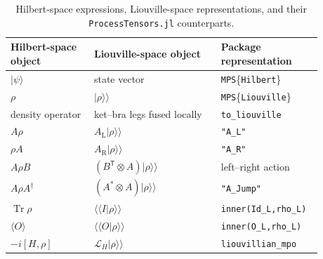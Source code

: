 %
\begin{table}[H]
    \centering \caption{Hilbert-space expressions, Liouville-space representations, and their \texttt{ProcessTensors.jl} counterparts.}
    \label{tab:liouville-dictionary}
    \begin{tabular}{p{0.25\linewidth}p{0.38\linewidth}p{0.25\linewidth}}
        \hline
        Hilbert-space object
        & Liouville-space object
        & Package representation \\ \hline \(\lvert\psi\rangle\)
        & state vector
        & \texttt{MPS}\{\texttt{Hilbert}\} \\ \(\rho\)
        & \(\lvert\rho\rangle\!\rangle\)
        & \texttt{MPS}\{\texttt{Liouville}\} \\ density operator
        & ket--bra legs fused locally
        & \texttt{to\_liouville} \\ \(A\rho\)
        & \(A_{\mathrm L}\lvert\rho\rangle\!\rangle\)
        & \texttt{"A\_L"} \\ \(\rho A\)
        & \(A_{\mathrm R}\lvert\rho\rangle\!\rangle\)
        & \texttt{"A\_R"} \\ \(A\rho B\)
        & \((B^{\mathsf T}\otimes A)\lvert\rho\rangle\!\rangle\)
        & left--right action \\ \(A\rho A^\dagger\)
        & \((A^*\otimes A)\lvert\rho\rangle\!\rangle\)
        & \texttt{"A\_Jump"} \\ \(\operatorname{Tr}\rho\)
        & \(\langle\!\langle I\vert\rho\rangle\!\rangle\)
        & \texttt{inner(Id\_L,rho\_L)} \\ \(\langle O\rangle\)
        & \(\langle\!\langle O\vert\rho\rangle\!\rangle\)
        & \texttt{inner(O\_L,rho\_L)} \\ \(-i[H,\rho]\)
        & \(\mathcal L_H\lvert\rho\rangle\!\rangle\)
        & \texttt{liouvillian\_mpo} \\ \hline
    \end{tabular}
\end{table}
%
